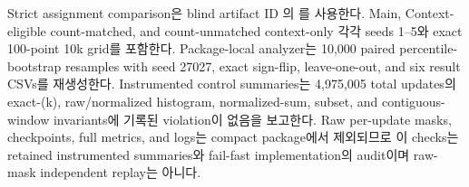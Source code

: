 \documentclass[letterpaper]{article}
\begin{document}
Strict assignment comparison은 blind artifact ID 의 를 사용한다. Main, Context-eligible count-matched, and count-unmatched context-only 각각 seeds 1--5와 exact 100-point 10k grid를 포함한다. Package-local analyzer는 10,000 paired percentile-bootstrap resamples with seed 27027, exact sign-flip, leave-one-out, and six result CSVs를 재생성한다. Instrumented control summaries는 4,975,005 total updates의 exact-(k), raw/normalized histogram, normalized-sum, subset, and contiguous-window invariants에 기록된 violation이 없음을 보고한다. Raw per-update masks, checkpoints, full metrics, and logs는 compact package에서 제외되므로 이 checks는 retained instrumented summaries와 fail-fast implementation의 audit이며 raw-mask independent replay는 아니다.
\end{document}
